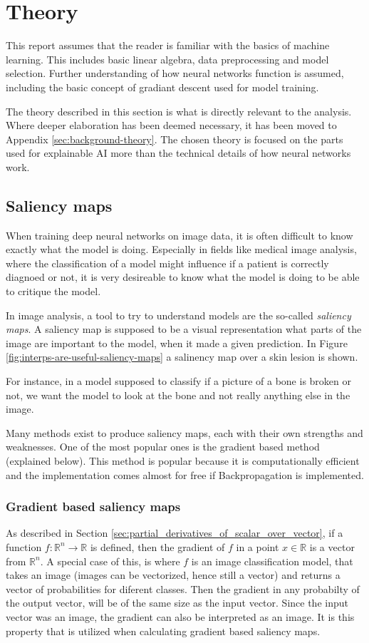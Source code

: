\chapter{Theory}
This report assumes that the reader is familiar with the basics of machine learning.
This includes basic linear algebra, data preprocessing and model selection.
Further understanding of how neural networks function is assumed,
including the basic concept of gradiant descent used for model training.

The theory described in this section is what is directly relevant to the analysis.
Where deeper elaboration has been deemed necessary, it has been moved to Appendix \ref{sec:background-theory}.
The chosen theory is focused on the parts used for explainable AI more than the technical details of how neural networks work.

\section{Saliency maps}\label{sec:saliency_maps}
When training deep neural networks on image data,
it is often difficult to know exactly what the model is doing.
Especially in fields like medical image analysis,
where the classification of a model might influence if a patient is correctly diagnoed or not,
it is very desireable to know what the model is doing to be able to critique the model.

In image analysis, a tool to try to understand models are the so-called \textit{saliency maps}.
A saliency map is supposed to be a visual representation what parts of the image are important to the model,
when it made a given prediction.
In Figure \ref{fig:interps-are-useful-saliency-maps} a salinency map over a skin lesion is shown.

For instance, in a model supposed to classify if a picture of a bone is broken or not,
we want the model to look at the bone and not really anything else in the image.

Many methods exist to produce saliency maps, each with their own strengths and weaknesses.
One of the most popular ones is the gradient based method (explained below).
This method is popular because it is computationally efficient and the implementation comes almost for free if Backpropagation is implemented.

\subsection{Gradient based saliency maps} \label{sec:gradiant_saliency_maps}
As described in Section \ref{sec:partial_derivatives_of_scalar_over_vector},
if a function $f: \mathbb{R}^n \rightarrow \mathbb{R}$ is defined,
then the gradient of $f$ in a point $x\in\mathbb{R}$ is a vector from $\mathbb{R}^n$.
A special case of this, is where $f$ is an image classification model, that takes
an image (images can be vectorized, hence still a vector) and returns a vector of probabilities for
diferent classes.
Then the gradient in any probabilty of the output vector, will be of the same size as the input vector.
Since the input vector was an image, the gradient can also be interpreted as an image.
It is this property that is utilized when calculating gradient based saliency maps.

